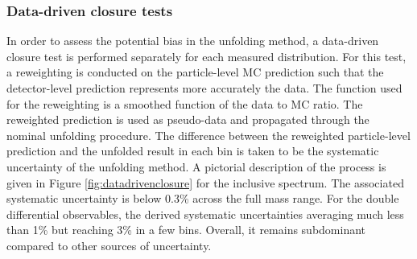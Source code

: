 \subsubsection{Data-driven closure tests}
\label{sssec:datadrivenclosure}
In order to assess the potential bias in the unfolding method, a data-driven closure test is performed separately for each measured distribution. For this test, a reweighting is conducted on the particle-level MC prediction such that the detector-level prediction represents more accurately the data. The function used for the reweighting is a smoothed function of the data to MC ratio. The reweighted prediction is used as pseudo-data and propagated through the nominal unfolding procedure. The difference between the reweighted particle-level prediction and the unfolded result in each bin is taken to be the systematic uncertainty of the unfolding method. A pictorial description of the process is given in Figure \ref{fig:datadrivenclosure} for the inclusive \mFourL spectrum. The associated systematic uncertainty is below 0.3\% across the full mass range. For the double differential observables, the derived systematic uncertainties averaging much less than 1\% but reaching 3\% in a few bins. Overall, it remains subdominant compared to other sources of uncertainty.
